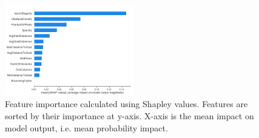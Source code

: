 



\begin{figure}[h]
    \centering
    \includegraphics[width=0.5\textwidth]{Charts/mean_all_classes.png}
    \caption{Feature importance calculated using Shapley values. Features are sorted by their importance at y-axis. X-axis is the mean impact on model output, i.e. mean probability impact.}
    \label{fig:FeatureImportance}
\end{figure}


